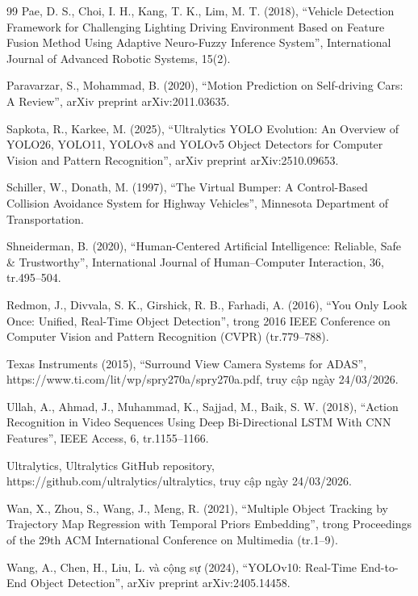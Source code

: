 \begin{thebibliography}{99}
Pae, D. S., Choi, I. H., Kang, T. K., Lim, M. T. (2018), 
“Vehicle Detection Framework for Challenging Lighting Driving Environment Based on Feature Fusion Method Using Adaptive Neuro-Fuzzy Inference System”, 
International Journal of Advanced Robotic Systems, 15(2).

Paravarzar, S., Mohammad, B. (2020), 
“Motion Prediction on Self-driving Cars: A Review”, 
arXiv preprint arXiv:2011.03635.

Sapkota, R., Karkee, M. (2025), 
“Ultralytics YOLO Evolution: An Overview of YOLO26, YOLO11, YOLOv8 and YOLOv5 Object Detectors for Computer Vision and Pattern Recognition”, 
arXiv preprint arXiv:2510.09653.

Schiller, W., Donath, M. (1997), 
“The Virtual Bumper: A Control-Based Collision Avoidance System for Highway Vehicles”, 
Minnesota Department of Transportation.

Shneiderman, B. (2020), 
“Human-Centered Artificial Intelligence: Reliable, Safe \& Trustworthy”, 
International Journal of Human–Computer Interaction, 36, tr.495--504.

Redmon, J., Divvala, S. K., Girshick, R. B., Farhadi, A. (2016), 
“You Only Look Once: Unified, Real-Time Object Detection”, 
trong 2016 IEEE Conference on Computer Vision and Pattern Recognition (CVPR) (tr.779--788).

Texas Instruments (2015), 
“Surround View Camera Systems for ADAS”, 
https://www.ti.com/lit/wp/spry270a/spry270a.pdf, 
truy cập ngày 24/03/2026.

Ullah, A., Ahmad, J., Muhammad, K., Sajjad, M., Baik, S. W. (2018), 
“Action Recognition in Video Sequences Using Deep Bi-Directional LSTM With CNN Features”, 
IEEE Access, 6, tr.1155--1166.

Ultralytics, 
Ultralytics GitHub repository, 
https://github.com/ultralytics/ultralytics, 
truy cập ngày 24/03/2026.

Wan, X., Zhou, S., Wang, J., Meng, R. (2021), 
“Multiple Object Tracking by Trajectory Map Regression with Temporal Priors Embedding”, 
trong Proceedings of the 29th ACM International Conference on Multimedia (tr.1--9).

Wang, A., Chen, H., Liu, L. và cộng sự (2024), 
“YOLOv10: Real-Time End-to-End Object Detection”, 
arXiv preprint arXiv:2405.14458.


\end{thebibliography}
